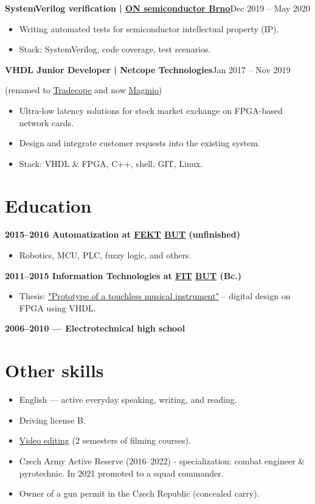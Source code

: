 \documentclass[10pt,a4paper]{article}
\let\plainhref\href
\renewcommand{\href}[2]{\plainhref{#1}{\underline{#2}}}
\newcommand{\role}[3]{\par\addvspace{5pt}\noindent\textbf{#1 | #2}\hfill #3\par}
\begin{document}
\newpage
{}
\role{SystemVerilog verification}{\href{https://www.onsemi.com/}{ON semiconductor Brno}}{Dec 2019 – May 2020}
\begin{itemize}
  \item Writing automated tests for semiconductor intellectual property (IP).
  \item Stack: SystemVerilog, code coverage, test scenarios.
\end{itemize}

\role{VHDL Junior Developer}{Netcope Technologies}{Jan 2017 – Nov 2019}
\noindent (renamed to \href{https://www.magmio.com/news/64-tradecope-becomes-magmio}{Tradecope} and now \href{https://www.magmio.com/}{Magmio})
\begin{itemize}
  \item Ultra-low latency solutions for stock market exchange on FPGA-based network cards.
  \item Design and integrate customer requests into the existing system.
  \item Stack: VHDL \& FPGA, C++, shell, GIT, Linux.
\end{itemize}

\section{Education}
\textbf{2015–2016 Automatization at \href{https://www.fekt.vut.cz/}{FEKT} \href{https://www.vut.cz/en/}{BUT} (unfinished)}
\begin{itemize}
  \item Robotics, MCU, PLC, fuzzy logic, and others.
\end{itemize}
\textbf{2011–2015 Information Technologies at \href{https://www.fit.vut.cz/.en}{FIT} \href{https://www.vut.cz/en/}{BUT} (Bc.)}
\begin{itemize}
  \item Thesis: \href{http://hdl.handle.net/11012/52470}{"Prototype of a touchless musical instrument"} – digital design on FPGA using VHDL.
\end{itemize}
\textbf{2006–2010 — Electrotechnical high school}

\section{Other skills}
\begin{itemize}
  \item English — active everyday speaking, writing, and reading.
  \item Driving license B.
  \item \href{https://www.youtube.com/watch?v=eeX0IiQeqAA}{Video editing} (2 semesters of filming courses).
  \item Czech Army Active Reserve (2016–2022) - specialization: combat engineer \& pyrotechnic. In 2021 promoted to a squad commander.
  \item Owner of a gun permit in the Czech Republic (concealed carry).
\end{itemize}
\end{document}
